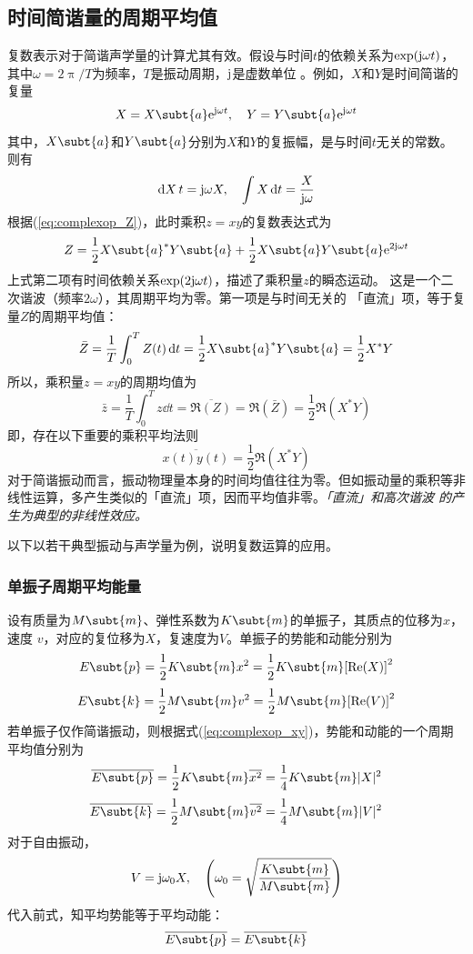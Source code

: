 \documentclass[UTF8]{ctexbook}
\begin{document}
\subsection{时间简谐量的周期平均值}
复数表示对于简谐声学量的计算尤其有效。假设与时间$t$的依赖关系为$\exp(\mathrm{j} 
\omega t)$，其中$\omega = 2\uppi /T$为频率，$T$是振动周期，$\mathrm{j}$是虚数单位
。例如，$X$和$Y$是时间简谐的复量
$$X=X\subt{a} \me^{\mj \omega t }\qc Y = Y\subt{a}\me^{\mj \omega t}$$
其中，$X\subt{a}$和$Y\subt{a}$分别为$X$和$Y$的复振幅，是与时间$t$无关的常数。
则有
$$\dd{X}{t}=\mj \omega X\qc \int X\dd{t} = \frac{X}{\mj \omega}$$
根据(\ref{eq:complexop_Z})，此时乘积$z=xy$的复数表达式为
$$Z=\frac12 X\subt{a}^* Y\subt{a}+\frac12 X\subt{a}Y\subt{a}\me^{2\mj \omega t}$$
上式第二项有时间依赖关系$\exp(2\mathrm{j} \omega  t)$，描述了乘积量$z$的瞬态运动。
这是一个二次谐波（频率$2\omega$），其周期平均为零。第一项是与时间无关的
「直流」项，等于复量$Z$的周期平均值：
$$\bar{Z} = \frac1T \int_0^T Z(t) \dd{t} = \frac12 X\subt{a}^* Y\subt{a} =
\frac12 X^* Y$$
所以，乘积量$z=xy$的周期均值为
$$\bar{z}=\frac1T \int_0^T z\dd{t} = \overline{\Re(Z)} = \Re(\bar{Z})
=\frac12\Re(X^*Y)$$
即，存在以下重要的乘积平均法则
\begin{equation}
	\overline{x(t)y(t)} = \frac12 \Re(X^*Y) \label{eq:complexop_xy}
\end{equation}
对于简谐振动而言，振动物理量本身的时间均值往往为零。但如振动量的乘积等非
线性运算，多产生类似的「直流」项，因而平均值非零。\emph{「直流」和高次谐波
的产生为典型的非线性效应。}

以下以若干典型振动与声学量为例，说明复数运算的应用。

\subsubsection{单振子周期平均能量}
设有质量为$M\subt{m}$、弹性系数为$K\subt{m}$的单振子，其质点的位移为$x$，速度
$v$，对应的复位移为$X$，复速度为$V$。单振子的势能和动能分别为
$$E\subt{p} = \frac12 K\subt{m} x^2 = \frac12 K\subt{m}\qty[\Re(X)]^2$$
$$E\subt{k} = \frac12 M\subt{m} v^2 = \frac12 M\subt{m} \qty[\Re(V)]^2$$
若单振子仅作简谐振动，则根据式(\ref{eq:complexop_xy})，势能和动能的一个周期
平均值分别为
$$\overline{E\subt{p}} = \frac12 K\subt{m} \overline{x^2} = \frac14 K\subt{m}
|X|^2$$
$$\overline{E\subt{k}} = \frac12 M\subt{m} \overline{v^2} = \frac14 M\subt{m}
|V|^2$$
对于自由振动，
$$V = \mj \omega_0 X\qc \qty(\omega_0 = \sqrt{\frac{K\subt{m}}{M\subt{m}}})$$
代入前式，知平均势能等于平均动能：
$$\overline{E\subt{p}} = \overline{E\subt{k}}$$
\end{document}
